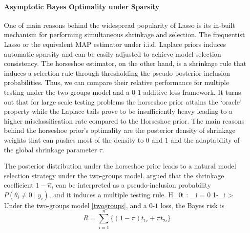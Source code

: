 \documentclass[11pt]{article}
\begin{document}

\paragraph{Asymptotic Bayes Optimality under Sparsity}

One of main reasons behind the widespread popularity of Lasso is its in-built mechanism for performing simultaneous shrinkage and selection. The frequentist Lasso or the equivalent MAP estimator under i.i.d. Laplace priors induces automatic sparsity and can be easily adjusted to achieve model selection consistency. The horseshoe estimator, on the other hand, is a shrinkage rule that induces a selection rule through thresholding the pseudo posterior inclusion probabilities. Thus, we can compare their relative performance for multiple testing under the two-groups model and a $0$-$1$ additive loss framework. It turns out that for large scale testing problems the horseshoe prior attains the `oracle' property while the Laplace tails prove to be insufficiently heavy leading to a higher misclassification rate compared to the Horseshoe prior. The main reasons behind the horseshoe prior's optimality are the posterior density of shrinkage weights that can pushes most of the density to $0$ and $1$ and the adaptability of the global shrinkage parameter $\tau$. 

The posterior distribution under the horseshoe prior leads to a natural model selection strategy under the two-groups model. \citet{carvalho2010horseshoe} argued that the shrinkage coefficient $1-\hat{\kappa}_i$ can be interpreted as a pseudo-inclusion probability $P(\theta_i \ne 0 \mid y_i)$, and it induces a multiple testing rule.
\beq
{} H_{0i} : \theta_i = 0  1-\hat{\kappa}_i > \half \label{eq:hsrule}
\eeq
Under the two-groups model \eqref{twogroups}, and a $0$-$1$ loss, the Bayes risk is 
\[
R = \sum_{i=1}^{n} \{ (1- \pi) t_{1i} + \pi t_{2i} \}
\]
\end{document}
